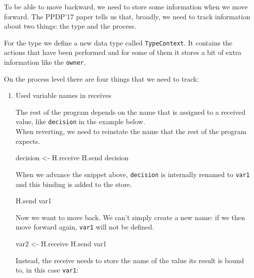 \documentclass[runningheads,plain]{llncs}
\newenvironment{Shaded}{}{}
\newcommand{\OtherTok}[1]{\textcolor[rgb]{0.00,0.44,0.13}{#1}}
\newcommand{\NormalTok}[1]{#1}
\begin{document}
To be able to move backward, we need to store some information when we move forward.
The PPDP'17 paper tells us that, broadly, we need to track information about two things: the type and the
process.

For the type we define a new data type called \texttt{TypeContext}. It
contains the actions that have been performed and for some of them it
stores a bit of extra information like the \texttt{owner}.

On the process level there are four things that we need to track:

\begin{enumerate}
\def\labelenumi{\arabic{enumi}.}
\item
  Used variable names in receives

  The rest of the program depends on the name that is assigned to a
  received value, like \texttt{decision} in the example below.\\
  When reverting, we need to reinstate the name that the rest of the
  program expects.

\begin{Shaded}
\begin{Highlighting}[]
\NormalTok{decision }\OtherTok{<-}\NormalTok{ H.receive    }
\NormalTok{H.send decision          }
\end{Highlighting}
\end{Shaded}

  When we advance the snippet above, \texttt{decision} is internally
  renamed to \texttt{var1} and this binding is added to the store.

\begin{Shaded}
\begin{Highlighting}[]
\NormalTok{H.send var1        }
\end{Highlighting}
\end{Shaded}

  Now we want to move back. We can't simply create a new name: if we
  then move forward again, \texttt{var1} will not be defined.

\begin{Shaded}
\begin{Highlighting}[]
\NormalTok{var2 }\OtherTok{<-}\NormalTok{ H.receive       }
\NormalTok{H.send var1             }
\end{Highlighting}
\end{Shaded}

  Instead, the receive needs to store the name of the value its result
  is bound to, in this case \texttt{var1}:


\end{enumerate}
\end{document}
